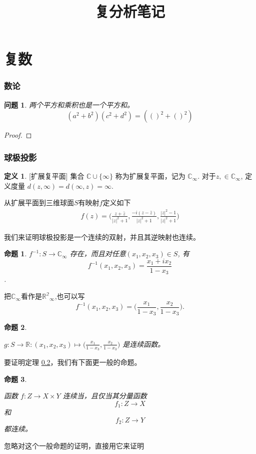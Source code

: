 \documentclass{ctexart}
\title{复分析笔记}
\newtheorem{question}{问题} %
\newtheorem{prop}{命题}[section]
\theoremstyle{definition}
\newtheorem{Definition}{定义}[section]
\begin{document}
\tableofcontents 

\part{复数}
\section*{数论}
\begin{question} 两个平方和乘积也是一个平方和。 \[(a^2+b^2)(c^2+d^2)=(()^2+()^2)\] 
 \end{question}
\begin{proof}  \end{proof}
\section*{球极投影}
\begin{Definition}{}[扩展复平面] 集合
    \(\mathbb{C}\cup \{\infty \}\) 称为扩展复平面，记为
    \(\mathbb{C}_{\infty}\). 对于$z,\in \mathbb{C}_{\infty}$, 定义度量 \(d(z,\infty)=d(\infty,z)=\infty\).  
\end{Definition}
从扩展平面到三维球面\(S\)有映射\(f\)定义如下
\begin{align}
    f(z)=\bigg(\frac{z+\bar{z}}{|z|^2+1} , \frac{-i(z-\bar{z})}{|z|^2+1}, \frac{|z|^2-1}{|z|^2+1}\bigg)
\end{align}


我们来证明球极投影是一个连续的双射，并且其逆映射也连续。

\begin{prop}{}
    \(f^{-1}\colon S\to \mathbb{C}_{\infty}\) 存在，而且对任意\((x_1,x_2,x_3)\in S\), 有\[f^{-1}(x_1,x_2,x_3)=\frac{x_1+ix_2}{1-x_3}\]. 
\end{prop}
把\(\mathbb{C}_{\infty}\)看作是\(\mathbb{R^2}_{\infty}\),也可以写 \[ f^{-1}(x_1,x_2,x_3)=\bigl( \frac{x_1}{1-x_3},\frac{x_2}{1-x_3} \bigl). \]
\begin{prop}\hypertarget{02}{}
    \(g\colon S\to \mathbb{R}\colon (x_1,x_2,x_3) \mapsto \bigl( \frac{x_1}{1-x_3},\frac{x_2}{1-x_3} \bigl) \) 是连续函数。
    
\end{prop}   
要证明定理 \hyperlink{02}{0.2}，我们有下面更一般的命题。
\begin{prop}\hypertarget{03}{}
    函数 \(f\colon Z\to X\times Y\) 连续当，且仅当其分量函数\[f_1\colon Z\to X\] 和 \[f_2\colon Z\to Y\] 都连续。 
\end{prop}
忽略对这个一般命题的证明，直接用它来证明
\end{document}
